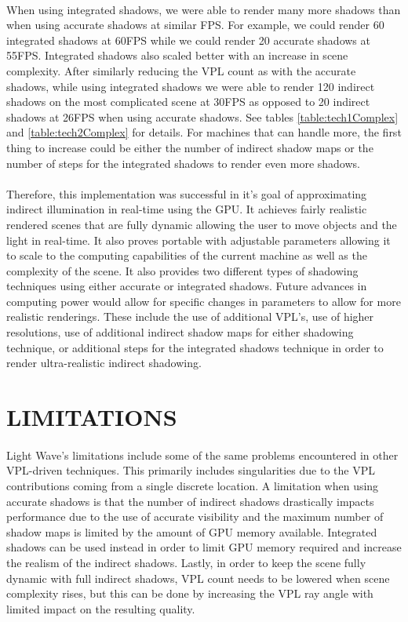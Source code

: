 \paragraph{}
When using integrated shadows, we were able to render many more shadows than when using accurate shadows at similar FPS.  For example, we could render 60 integrated shadows at 60FPS while we could render 20 accurate shadows at 55FPS.  Integrated shadows also scaled better with an increase in scene complexity.  After similarly reducing the VPL count as with the accurate shadows, while using integrated shadows we were able to render 120 indirect shadows on the most complicated scene at 30FPS as opposed to 20 indirect shadows at 26FPS when using accurate shadows.  See tables \ref{table:tech1Complex} and \ref{table:tech2Complex} for details.  For machines that can handle more, the first thing to increase could be either the number of indirect shadow maps or the number of steps for the integrated shadows to render even more shadows.

\paragraph{}
Therefore, this implementation was successful in it's goal of approximating indirect illumination in real-time using the GPU.  It achieves fairly realistic rendered scenes that are fully dynamic allowing the user to move objects and the light in real-time.  It also proves portable with adjustable parameters allowing it to scale to the computing capabilities of the current machine as well as the complexity of the scene.  It also provides two different types of shadowing techniques using either accurate or integrated shadows.  Future advances in computing power would allow for specific changes in parameters to allow for more realistic renderings.  These include the use of additional VPL's, use of higher resolutions, use of additional indirect shadow maps for either shadowing technique, or additional steps for the integrated shadows technique in order to render ultra-realistic indirect shadowing.

\section{LIMITATIONS}
\paragraph{}
Light Wave's limitations include some of the same problems encountered in other VPL-driven techniques.  This primarily includes singularities due to the VPL contributions coming from a single discrete location.  A limitation when using accurate shadows is that the number of indirect shadows drastically impacts performance due to the use of accurate visibility and the maximum number of shadow maps is limited by the amount of GPU memory available.  Integrated shadows can be used instead in order to limit GPU memory required and increase the realism of the indirect shadows.  Lastly, in order to keep the scene fully dynamic with full indirect shadows, VPL count needs to be lowered when scene complexity rises, but this can be done by increasing the VPL ray angle with limited impact on the resulting quality.

